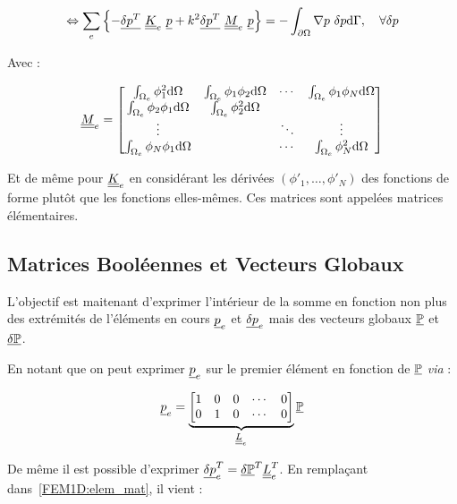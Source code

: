 \begin{equation}
	\Leftrightarrow \sum_e\left\{- \underline{\delta p^T}~\underline{\underline{K}}_e~\underline{p} + k^2 \underline{\delta p^T}~\underline{\underline{M}}_e~\underline{p} \right\} = -\int_{\partial\Omega}\nabla p~\delta p\mathrm{d}\Gamma, \quad \forall\delta p\label{FEM1D:elem_mat}\\
\end{equation}

Avec :

\begin{equation*}
	\underline{\underline{M}}_e = \begin{bmatrix}
		\int_{\Omega_e}\phi_1^2\mathrm{d}\Omega & \int_{\Omega_e}\phi_1\phi_2\mathrm{d}\Omega & \cdots  &\int_{\Omega_e}\phi_1\phi_N\mathrm{d}\Omega\\
		\int_{\Omega_e}\phi_2\phi_1\mathrm{d}\Omega & \int_{\Omega_e}\phi_2^2\mathrm{d}\Omega & &\\
		\vdots & & \ddots & \vdots\\
		\int_{\Omega_e}\phi_N\phi_1\mathrm{d}\Omega & & \cdots & \int_{\Omega_e}\phi_N^2\mathrm{d}\Omega
	\end{bmatrix}
\end{equation*}

Et de même pour $\underline{\underline{K}}_e$ en considérant les dérivées $(\phi'_1,\ldots,\phi'_N)$ des fonctions de forme plutôt que les
fonctions elles-mêmes. Ces matrices sont appelées matrices élémentaires.

\subsection{Matrices Booléennes et Vecteurs Globaux}
\newcommand{\GP}{\ul{\mathbb{P}}}
\newcommand{\GDP}{\ul{\delta\mathbb{P}}}
L'objectif est maitenant d'exprimer l'intérieur de la somme en fonction non plus des extrémités de l'éléments en cours
$\underline{p}_e$ et $\underline{\delta p}_e$ mais des vecteurs globaux $\GP$ et $\GDP$.

En notant que on peut exprimer $\underline{p}_e$ sur le premier élément en fonction de $\GP$ \textit{via} :

\begin{equation*}
    \ul{p}_e =
    \underbrace{\begin{bmatrix}
         1 & 0 & 0 & \cdots & 0\\
         0 & 1 & 0 & \cdots & 0
    \end{bmatrix}}_{\uul{L}_e}\GP
\end{equation*}

De même il est possible d'exprimer $\ul{\DP}_e^T = \GDP^T\uul{L}_e^T$. En remplaçant dans~\eqref{FEM1D:elem_mat}, il
vient :

